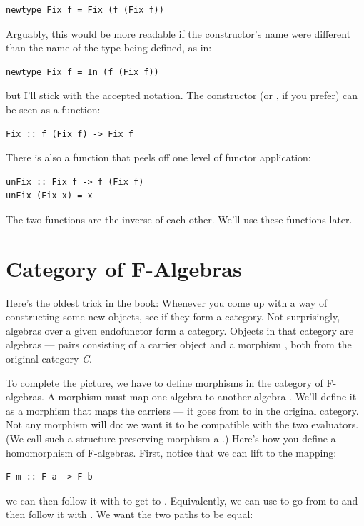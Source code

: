 \begin{verbatim}
newtype Fix f = Fix (f (Fix f))
\end{verbatim}
Arguably, this would be more readable if the constructor's name were
different than the name of the type being defined, as in:

\begin{verbatim}
newtype Fix f = In (f (Fix f))
\end{verbatim}
but I'll stick with the accepted notation. The constructor 
(or , if you prefer) can be seen as a function:

\begin{verbatim}
Fix :: f (Fix f) -> Fix f
\end{verbatim}
There is also a function that peels off one level of functor
application:

\begin{verbatim}
unFix :: Fix f -> f (Fix f)
unFix (Fix x) = x
\end{verbatim}
The two functions are the inverse of each other. We'll use these
functions later.

\section{Category of F-Algebras}\label{category-of-f-algebras}

Here's the oldest trick in the book: Whenever you come up with a way of
constructing some new objects, see if they form a category. Not
surprisingly, algebras over a given endofunctor  form a
category. Objects in that category are algebras --- pairs consisting of
a carrier object  and a morphism
, both from the original category
\emph{C}.

To complete the picture, we have to define morphisms in the category of
F-algebras. A morphism must map one algebra  to another
algebra . We'll define it as a morphism  that
maps the carriers --- it goes from  to  in the
original category. Not any morphism will do: we want it to be compatible
with the two evaluators. (We call such a structure-preserving morphism a
.) Here's how you define a homomorphism of
F-algebras. First, notice that we can lift  to the mapping:

\begin{verbatim}
F m :: F a -> F b
\end{verbatim}
we can then follow it with  to get to .
Equivalently, we can use  to go from  to
 and then follow it with . We want the two paths to
be equal:

